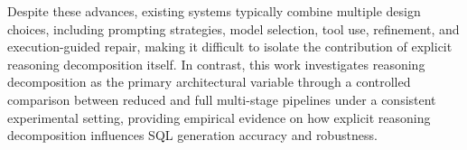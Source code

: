 \documentclass{svproc}
\begin{document}
Despite these advances, existing systems typically combine multiple design choices, including prompting strategies, model selection, tool use, refinement, and execution-guided repair, making it difficult to isolate the contribution of explicit reasoning decomposition itself. In contrast, this work investigates reasoning decomposition as the primary architectural variable through a controlled comparison between reduced and full multi-stage pipelines under a consistent experimental setting, providing empirical evidence on how explicit reasoning decomposition influences SQL generation accuracy and robustness.





\end{document}
